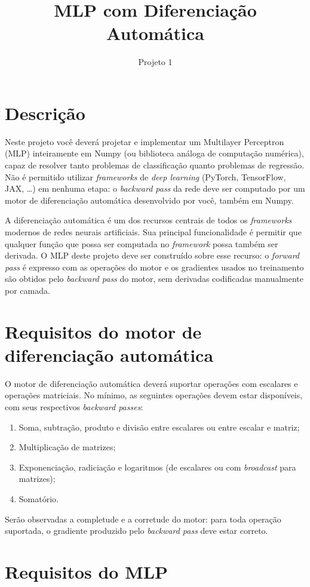 \documentclass{dlproblemset}
\title{MLP com Diferenciação Automática}
\subtitle{Projeto 1}
\begin{document}
\section*{Descrição}

Neste projeto você deverá projetar e implementar um Multilayer Perceptron (MLP) inteiramente em Numpy (ou biblioteca análoga de computação numérica), capaz de resolver tanto problemas de classificação quanto problemas de regressão. Não é permitido utilizar \textit{frameworks} de \textit{deep learning} (PyTorch, TensorFlow, JAX, \ldots) em nenhuma etapa: o \textit{backward pass} da rede deve ser computado por um motor de diferenciação automática desenvolvido por você, também em Numpy.

A diferenciação automática é um dos recursos centrais de todos os \textit{frameworks} modernos de redes neurais artificiais. Sua principal funcionalidade é permitir que qualquer função que possa ser computada no \textit{framework} possa também ser derivada. O MLP deste projeto deve ser construído sobre esse recurso: o \textit{forward pass} é expresso com as operações do motor e os gradientes usados no treinamento são obtidos pelo \textit{backward pass} do motor, sem derivadas codificadas manualmente por camada.

\section*{Requisitos do motor de diferenciação automática}

O motor de diferenciação automática deverá suportar operações com escalares e operações matriciais. No mínimo, as seguintes operações devem estar disponíveis, com seus respectivos \textit{backward passes}:

\begin{enumerate}[1)]
    \item Soma, subtração, produto e divisão entre escalares ou entre escalar e matriz;
    \item Multiplicação de matrizes;
    \item Exponenciação, radiciação e logaritmos (de escalares ou com \textit{broadcast} para matrizes);
    \item Somatório.
\end{enumerate}

Serão observadas a completude e a corretude do motor: para toda operação suportada, o gradiente produzido pelo \textit{backward pass} deve estar correto. 

\section*{Requisitos do MLP}
\end{document}

